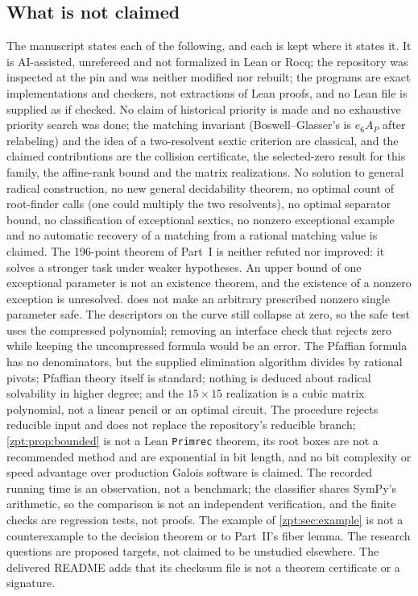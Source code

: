 \documentclass[11pt,letterpaper]{article}
\numberwithin{equation}{section}
\theoremstyle{definition}
\theoremstyle{remark}
\newcommand{\src}[1]{\texttt{\nolinkurl{#1}}}
\begin{document}
\subsection{What is not claimed}
\label{zpt:sec:nonclaims}

The manuscript states each of the following, and each is kept where it
states it. It is AI-assisted, unrefereed and not formalized in Lean or
Rocq; the repository was inspected at the pin and was neither modified nor
rebuilt; the programs are exact implementations and checkers, not
extractions of Lean proofs, and no Lean file is supplied as if checked.
No claim of historical priority is made and no exhaustive priority search
was done; the matching invariant (Boswell--Glasser's is $e_6A_P$ after
relabeling) and the idea of a two-resolvent sextic criterion are classical,
and the claimed contributions are the collision certificate, the
selected-zero result for this family, the affine-rank bound and the matrix
realizations. No solution to general radical construction, no new general
decidability theorem, no optimal count of root-finder calls (one could
multiply the two resolvents), no optimal separator bound, no classification
of exceptional sextics, no nonzero exceptional example and no automatic
recovery of a matching from a rational matching value is claimed. The
196-point theorem of Part~I is neither refuted nor improved: it solves a
stronger task under weaker hypotheses. An upper bound of one exceptional
parameter is not an existence theorem, and the existence of a nonzero
exception is unresolved.  does not make an arbitrary
prescribed nonzero single parameter safe. The descriptors on the curve
still collapse at zero, so the safe test uses the compressed polynomial;
removing an interface check that rejects zero while keeping the
uncompressed formula would be an error. The Pfaffian formula has no
denominators, but the supplied elimination algorithm divides by rational
pivots; Pfaffian theory itself is standard; nothing is deduced about
radical solvability in higher degree; and the $15\times15$ realization is a
cubic matrix polynomial, not a linear pencil or an optimal circuit. The
procedure rejects reducible input and does not replace the repository's
reducible branch; \cref{zpt:prop:bounded} is not a Lean \src{Primrec}
theorem, its root boxes are not a recommended method and are exponential in
bit length, and no bit complexity or speed advantage over production Galois
software is claimed. The recorded running time is an observation, not a
benchmark; the classifier shares SymPy's arithmetic, so the comparison is
not an independent verification, and the finite checks are regression
tests, not proofs. The example of \cref{zpt:sec:example} is not a
counterexample to the decision theorem or to Part~II's fiber lemma. The
research questions are proposed targets, not claimed to be unstudied
elsewhere. The delivered README adds that its checksum file is not a theorem
certificate or a signature.
\end{document}
